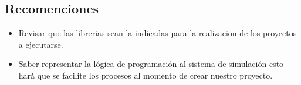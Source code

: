 \documentclass[10pt,a4paper]{article}
\begin{document}
\subsection{Recomenciones}
\begin{itemize}
\item Revisar que las librerias sean la indicadas para la realizacion de los proyectos a ejecutarse.
\item Saber representar la lógica de programación al sistema de simulación esto hará́ que se facilite los procesos al momento de crear nuestro proyecto.
\end{itemize}
\end{document}
